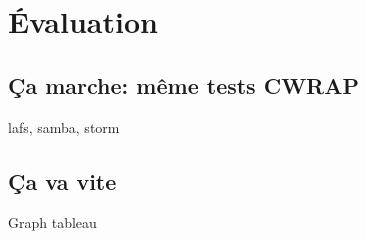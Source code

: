 \section{Évaluation}
\subsection{Ça marche: même tests CWRAP}
lafs, samba, storm
\subsection{Ça va vite}
Graph tableau
